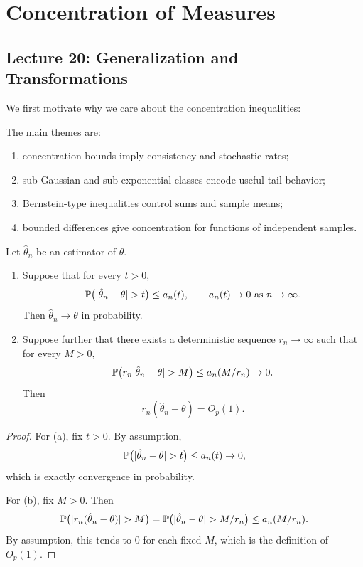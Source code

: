 \chapter{Concentration of Measures}
\section{Lecture 20: Generalization and Transformations}


We first motivate why we care about the concentration inequalities:

The main themes are:
\begin{enumerate}[label=(\arabic*)]
    \item concentration bounds imply consistency and stochastic rates;
    \item sub-Gaussian and sub-exponential classes encode useful tail behavior;
    \item Bernstein-type inequalities control sums and sample means;
    \item bounded differences give concentration for functions of independent samples.
\end{enumerate}

\begin{prop}
Let $\hat\theta_n$ be an estimator of $\theta$.

\begin{enumerate}[label=(\alph*)]
    \item Suppose that for every $t>0$,
    \[
    \pr\bigl(|\hat\theta_n-\theta|>t\bigr)\le a_n(t),
    \qquad a_n(t)\to 0 \text{ as } n\to\infty.
    \]
    Then $\hat\theta_n \to \theta$ in probability.

    \item Suppose further that there exists a deterministic sequence $r_n\to\infty$ such that for every $M>0$,
    \[
    \pr\bigl(r_n|\hat\theta_n-\theta|>M\bigr)
    \le a_n(M/r_n)\to 0.
    \]
    Then
    \[
    r_n(\hat\theta_n-\theta)=O_p(1).
    \]
\end{enumerate}
\end{prop}

\begin{proof}
For (a), fix $t>0$. By assumption,
\[
\pr\bigl(|\hat\theta_n-\theta|>t\bigr)\le a_n(t)\to 0,
\]
which is exactly convergence in probability.

For (b), fix $M>0$. Then
\[
\pr\bigl(|r_n(\hat\theta_n-\theta)|>M\bigr)
=
\pr\bigl(|\hat\theta_n-\theta|>M/r_n\bigr)
\le a_n(M/r_n).
\]
By assumption, this tends to $0$ for each fixed $M$, which is the definition of $O_p(1)$.
\end{proof}

